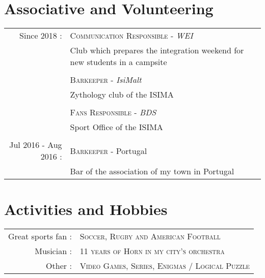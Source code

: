 \documentclass[a4paper,10pt]{article}
\begin{document}
\section{Associative and Volunteering}
\begin{tabular}{rl}
Since 2018 :& \textsc{Communication Responsible -} \emph{WEI}\\
& \footnotesize{Club which prepares the integration weekend for new students in a campsite}\\
\\& \textsc{Barkeeper -} \emph{IsiMalt} \\
& \footnotesize{Zythology club of the ISIMA} \\
\\& \textsc{Fans Responsible -} \emph{BDS} \\
& \footnotesize{Sport Office of the ISIMA} \\
\\ Jul 2016 - Aug 2016 : & \textsc{Barkeeper - }Portugal \\ & \footnotesize{Bar of the association of my town in Portugal}
\end{tabular}

\section{Activities and Hobbies}
\begin{tabular}{rl}
Great sports fan : & \textsc{Soccer, Rugby and American Football} \\
Musician : & \textsc{11 years of Horn in my city's orchestra} \\
Other : & \textsc{Video Games, Series, Enigmas / Logical Puzzle}
\end{tabular}
\end{document}
